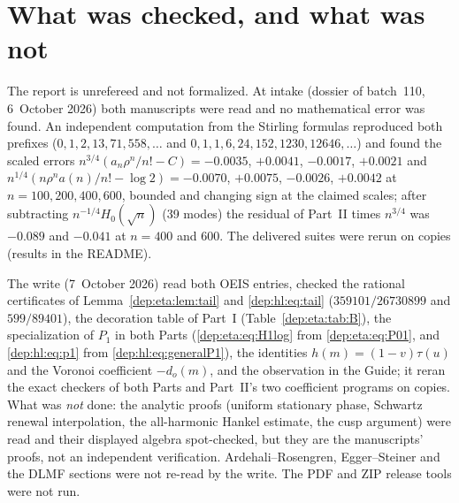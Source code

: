 \documentclass[11pt]{article}
\theoremstyle{definition}\newtheorem{definition}[theorem]{Definition}
\theoremstyle{remark}\newtheorem{remark}[theorem]{Remark}
\begin{document}
\section*{What was checked, and what was not}\label{dep:sec:trust}
The report is unrefereed and not formalized. At intake (dossier of batch~110,
6~October 2026) both manuscripts were read and no mathematical error was found.
An independent computation from the Stirling formulas reproduced both
prefixes ($0,1,2,13,71,558,\dots$ and $0,1,1,6,24,152,1230,12646,\dots$) and
found the scaled errors $n^{3/4}(a_n\rho^n/n!-C)=-0.0035$, $+0.0041$,
$-0.0017$, $+0.0021$ and $n^{1/4}(n\rho^na(n)/n!-\log2)=-0.0070$, $+0.0075$,
$-0.0026$, $+0.0042$ at $n=100,200,400,600$, bounded and changing sign at the
claimed scales; after subtracting $n^{-1/4}H_0(\sqrt n)$ (39 modes) the
residual of Part~II times $n^{3/4}$ was $-0.089$ and $-0.041$ at $n=400$ and
$600$. The delivered suites were rerun on copies (results in the README).

The write (7~October 2026) read both OEIS entries, checked the rational
certificates of Lemma~\ref{dep:eta:lem:tail} and \eqref{dep:hl:eq:tail}
($359101/26730899$ and $599/89401$), the decoration table of Part~I
(Table~\ref{dep:eta:tab:B}), the specialization of $P_1$ in both Parts
(\eqref{dep:eta:eq:H1log} from \eqref{dep:eta:eq:P01}, and \eqref{dep:hl:eq:p1}
from \eqref{dep:hl:eq:generalP1}), the identities $h(m)=(1-v)\tau(u)$ and the
Voronoi coefficient $-d_o(m)$, and the observation in the Guide; it reran the
exact checkers of both Parts and Part~II's two coefficient programs on copies.
What was \emph{not} done: the analytic proofs (uniform stationary phase,
Schwartz renewal interpolation, the all-harmonic Hankel estimate, the cusp
argument) were read and their displayed algebra spot-checked, but they are the
manuscripts' proofs, not an independent verification. Ardehali--Rosengren,
Egger--Steiner and the DLMF sections were not re-read by the write. The PDF and
ZIP release tools were not run.
\end{document}
